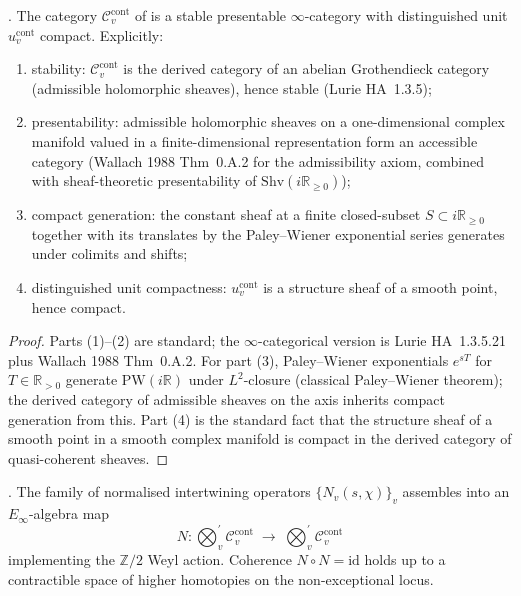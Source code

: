 \begin{proposition}
\label{v4-arith:w6-d:prop:C-cont-stable-pres}
\ClaimStatusProvedHere. The category \(\mathcal{C}^{\mathrm{cont}}_{v}\)
of  is a stable presentable
\(\infty\)-category with distinguished unit \(u^{\mathrm{cont}}_{v}\)
compact. Explicitly:
\begin{enumerate}
\item stability: \(\mathcal{C}^{\mathrm{cont}}_{v}\) is the derived
category of an abelian Grothendieck category (admissible
holomorphic sheaves), hence stable (Lurie HA~1.3.5);
\item presentability: admissible holomorphic sheaves on a
one-dimensional complex manifold valued in a finite-dimensional
representation form an accessible category (Wallach 1988 Thm~0.A.2
for the admissibility axiom, combined with sheaf-theoretic
presentability of \(\mathrm{Shv}(i\mathbb{R}_{\geq 0})\));
\item compact generation: the constant sheaf at a finite
closed-subset \(S\subset i\mathbb{R}_{\geq 0}\) together with its
translates by the Paley--Wiener exponential series generates under
colimits and shifts;
\item distinguished unit compactness: \(u^{\mathrm{cont}}_{v}\) is a
structure sheaf of a smooth point, hence compact.
\end{enumerate}
\end{proposition}

\begin{proof}
Parts (1)--(2) are standard; the \(\infty\)-categorical version is
Lurie HA~1.3.5.21 plus Wallach 1988 Thm~0.A.2. For part (3),
Paley--Wiener exponentials \(e^{sT}\) for \(T\in\mathbb{R}_{>0}\)
generate \(\mathrm{PW}(i\mathbb{R})\) under \(L^{2}\)-closure (classical
Paley--Wiener theorem); the derived category of admissible sheaves
on the axis inherits compact generation from this. Part (4) is
the standard fact that the structure sheaf of a smooth point in a
smooth complex manifold is compact in the derived category of
quasi-coherent sheaves.
\end{proof}

\begin{proposition}
\label{v4-arith:w6-d:prop:Weyl-coherent}
\ClaimStatusProvedHere. The family of normalised intertwining
operators \(\{N_{v}(s,\chi)\}_{v}\) assembles into an
\(E_{\infty}\)-algebra map
\begin{equation}
\label{v4-arith:w6-d:eq:Weyl-coherent}
N\colon\bigotimes_{v}^{\prime}\mathcal{C}^{\mathrm{cont}}_{v}\;\longrightarrow\;\bigotimes_{v}^{\prime}\mathcal{C}^{\mathrm{cont}}_{v}
\end{equation}
implementing the \(\mathbb{Z}/2\) Weyl action. Coherence
\(N\circ N=\mathrm{id}\) holds up to a contractible space of
higher homotopies on the non-exceptional locus.
\end{proposition}

